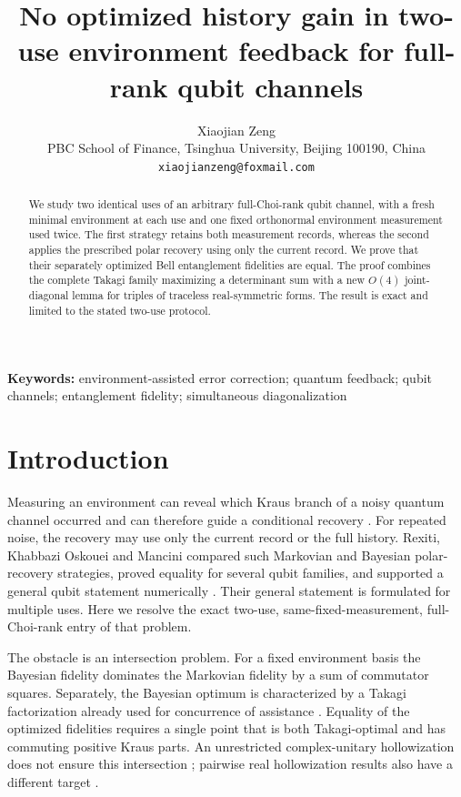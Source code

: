 \documentclass[11pt]{article}
\title{No optimized history gain in two-use environment feedback for full-rank qubit channels}
\author{Xiaojian Zeng\\
\small PBC School of Finance, Tsinghua University, Beijing 100190, China\\
\small \texttt{xiaojianzeng@foxmail.com}}
\date{}
\theoremstyle{remark}
\newcommand{\1}{\mathbb{I}}
\begin{document}
\maketitle

\begin{abstract}
We study two identical uses of an arbitrary full-Choi-rank qubit channel, with a fresh minimal environment at each use and one fixed orthonormal environment measurement used twice. The first strategy retains both measurement records, whereas the second applies the prescribed polar recovery using only the current record. We prove that their separately optimized Bell entanglement fidelities are equal. The proof combines the complete Takagi family maximizing a determinant sum with a new $O(4)$ joint-diagonal lemma for triples of traceless real-symmetric forms. The result is exact and limited to the stated two-use protocol.
\end{abstract}

\noindent\textbf{Keywords:} environment-assisted error correction; quantum feedback; qubit channels; entanglement fidelity; simultaneous diagonalization

\section{Introduction}

Measuring an environment can reveal which Kraus branch of a noisy quantum
channel occurred and can therefore guide a conditional recovery
\cite{GregorattiWerner2004,HaydenKing2005}.  For repeated noise, the recovery
may use only the current record or the full history.  Rexiti, Khabbazi Oskouei
and Mancini compared such Markovian and Bayesian polar-recovery strategies,
proved equality for several qubit families, and supported a general qubit
statement numerically \cite{RexitiEtAl2024}.  Their general statement is
formulated for multiple uses.  Here we resolve the exact two-use,
same-fixed-measurement, full-Choi-rank entry of that problem.

The obstacle is an intersection problem.  For a fixed environment basis the
Bayesian fidelity dominates the Markovian fidelity by a sum of commutator
squares.  Separately, the Bayesian optimum is characterized by a Takagi
factorization already used for concurrence of assistance
\cite{LaustsenEtAl2003}.  Equality of the optimized fidelities requires a
single point that is both Takagi-optimal and has commuting positive Kraus
parts.  An unrestricted complex-unitary hollowization does not ensure this
intersection \cite{HaydenKing2005}; pairwise real hollowization results also
have a different target \cite{DammFassbender2020,Nicholus2026}.
\end{document}

